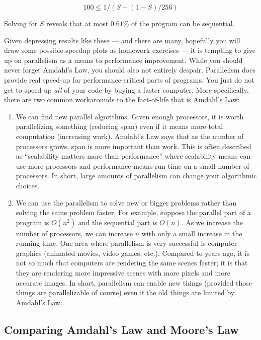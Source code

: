 \documentclass[10pt]{article}
\begin{document}
\[ 100 \leq 1 / (S + (1-S)/256) \]

Solving for $S$ reveals that at most $0.61\%$ of the program can be
sequential.

Given depressing results like these --- and there are many, hopefully
you will draw some possible-speedup plots as homework exercises ---
it is tempting to give up on parallelism as a means to performance
improvement.  While you should never forget Amdahl's Law, you should
also not entirely despair.  Parallelism does provide real speed-up for
performance-critical parts of programs.  You just do not get to
speed-up \emph{all} of your code by buying a faster computer.  More
specifically, there are two common workarounds to the fact-of-life
that is Amdahl's Law:

\begin{enumerate}
\item We can find new parallel algorithms.  Given enough processors,
  it is worth parallelizing something (reducing span) even if it means
  more total computation (increasing work).  Amdahl's Law says that as
  the number of processors grows, span is more important than work.
  This is often described as ``scalability matters more than
  performance'' where scalability means can-use-more-processors and
  performance means run-time on a small-number-of-processors.  In
  short, large amounts of parallelism can change your algorithmic
  choices.
\item We can use the parallelism to solve new or bigger problems
  rather than solving the same problem faster.  For example, suppose
  the parallel part of a program is $O(n^2)$ and the sequential part
  is $O(n)$.  As we increase the number of processors, we can increase
  $n$ with only a small increase in the running time.  One area where
  parallelism is very successful is computer graphics (animated
  movies, video games, etc.).  Compared to years ago, it is not so
  much that computers are rendering the same scenes faster; it is that
  they are rendering more impressive scenes with more pixels and more
  accurate images.  In short, parallelism can enable new things
  (provided those things are parallelizable of course) even if the old
  things are limited by Amdahl's Law.
\end{enumerate}

\subsection{Comparing Amdahl's Law and Moore's Law}
\end{document}
